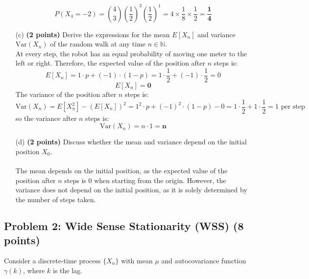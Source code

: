 \documentclass{article}
\begin{document}
\begin{itemize}
    \[
    P(X_4 = -2) = \binom{4}{3} \left(\frac{1}{2}\right)^3 \left(\frac{1}{2}\right)^1 = 4 \times \frac{1}{8} \times \frac{1}{2} = \mathbf{\frac{1}{4}}
    \]
    \item[(c)] \textbf{(2 points)} Derive the expressions for the mean \( E[X_n] \) and variance \( \text{Var}(X_n) \) of the random walk at any time \( n \in \mathbb{N} \).
    \\ At every step, the robot has an equal probability of moving one meter to the left or right. Therefore, the expected value of the position after \( n \) steps is:
    \[
    E[X_n] = 1 \cdot p + (-1) \cdot (1-p) = 1 \cdot \frac{1}{2} + (-1) \cdot \frac{1}{2} = 0
    \]
    \[
    E[X_n] = \textbf{0}
    \]
    The variance of the position after \( n \) steps is:
    \[
    \text{Var}(X_n) = E[X_n^2] - (E[X_n])^2 = 1^2 \cdot p + (-1)^2 \cdot (1-p) - 0 = 1 \cdot \frac{1}{2} + 1 \cdot \frac{1}{2} = 1 \text{ per step}  
    \]
    so the variance after \( n \) steps is:
    \[
    \text{Var}(X_n) = n \cdot 1 = \mathbf{n}
    \]
    \item[(d)] \textbf{(2 points)} Discuss whether the mean and variance depend on the initial position \( X_0 \).
    \\\\ The mean depends on the initial position, as the expected value of the position after \( n \) steps is 0 when starting from the origin. However, the variance does not depend on the initial position, as it is solely determined by the number of steps taken.
\end{itemize}



\subsection*{Problem 2: Wide Sense Stationarity (WSS) (8 points)}

Consider a discrete-time process \( \{X_n\} \) with mean \( \mu \) and autocovariance function \( \gamma(k) \), where \( k \) is the lag.
\end{document}
